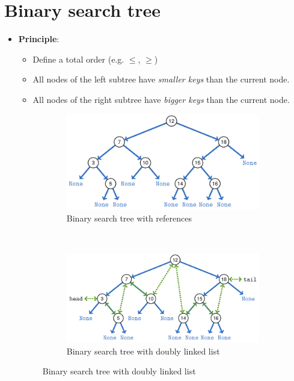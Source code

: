 \documentclass[12pt, a4paper]{scrartcl}
\begin{document}
\section{Binary search tree}
\label{sec:binary_search_tree}
\begin{itemize}
\item \textbf{Principle}:
  \begin{itemize}
  \item Define a total order (e.g. $\le$, $\ge$)
  \item All nodes of the left subtree have \emph{smaller keys} than the current node.
  \item All nodes of the right subtree have \emph{bigger keys} than the current node.
  \end{itemize}
  \begin{figure}[htbp]
    \centering
    \begin{subfigure}[b]{.4\textwidth}
      \includegraphics[width=\textwidth]{search_tree_ref}
      \caption{Binary search tree with references}
      \label{fig:binary_search_tree}
    \end{subfigure}
    ~
    \begin{subfigure}[b]{.47\textwidth}
      \includegraphics[width=\textwidth]{search_tree_linked}
      \caption{Binary search tree with doubly linked list}

\end{subfigure}
\end{figure}
\end{itemize}
\end{document}
